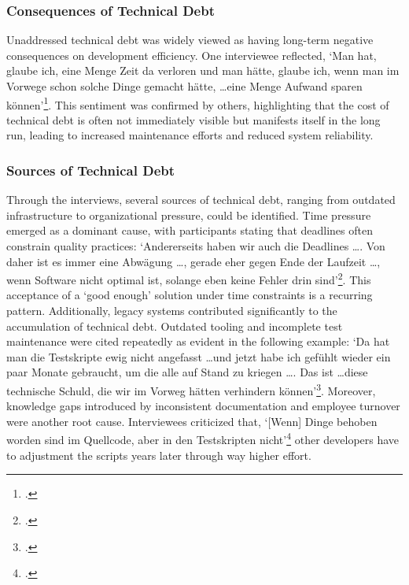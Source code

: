 \subsubsection{Consequences of Technical Debt}
Unaddressed technical debt was widely viewed as having long-term negative consequences on development efficiency. One interviewee reflected, `Man hat, glaube ich, eine Menge Zeit da verloren und man hätte, glaube ich, wenn man im Vorwege schon solche Dinge gemacht hätte, \ldots eine Menge Aufwand sparen können'\footcite{Interview12025}.
This sentiment was confirmed by others, highlighting that the cost of technical debt is often not immediately visible but manifests itself in the long run, leading to increased maintenance efforts and reduced system reliability.

\subsubsection{Sources of Technical Debt}
Through the interviews, several sources of technical debt, ranging from outdated infrastructure to organizational pressure, could be identified. Time pressure emerged as a dominant cause, with participants stating that deadlines often constrain quality practices: `Andererseits haben wir auch die Deadlines \ldots. Von daher ist es immer eine Abwägung
\ldots, gerade eher gegen Ende der Laufzeit \ldots, wenn Software nicht optimal ist, solange eben keine Fehler drin sind'\footcite{Interview22025}. This acceptance of a `good enough' solution under time constraints is a recurring pattern.
Additionally, legacy systems contributed significantly to the accumulation of technical debt. Outdated tooling and incomplete test maintenance were cited repeatedly as evident in the following example: `Da hat man die Testskripte ewig nicht angefasst \ldots und jetzt habe ich gefühlt wieder ein paar Monate gebraucht, um die alle auf Stand zu kriegen \ldots.
Das ist \ldots diese technische Schuld, die wir im Vorweg hätten verhindern können'\footcite{Interview12025}. Moreover, knowledge gaps introduced by inconsistent documentation and employee turnover were another root cause. Interviewees criticized that, `[Wenn] Dinge behoben worden sind im Quellcode, aber in den Testskripten nicht'\footcite{Interview12025}
other developers have to adjustment the scripts years later through way higher effort.

